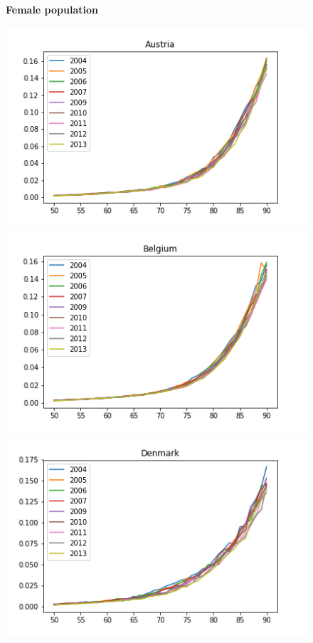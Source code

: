 \begin{figure}[H]
\centering \textbf{Female population}\par\medskip
{}
  \includegraphics[width=\linewidth]{images/mortality_female_1.png}
\endminipage\hfill
{}
  \includegraphics[width=\linewidth]{images/mortality_female_2.png}
\endminipage\hfill
{}%
  \includegraphics[width=\linewidth]{images/mortality_female_3.png}

\end{figure}
